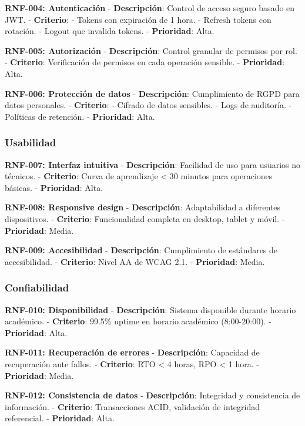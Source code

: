 \documentclass[12pt,a4paper,oneside]{report}
\begin{document}
\textbf{RNF-004: Autenticación} - \textbf{Descripción}: Control de
acceso seguro basado en JWT. - \textbf{Criterio}: - Tokens con
expiración de 1 hora. - Refresh tokens con rotación. - Logout que
invalida tokens. - \textbf{Prioridad}: Alta.

\textbf{RNF-005: Autorización} - \textbf{Descripción}: Control granular
de permisos por rol. - \textbf{Criterio}: Verificación de permisos en
cada operación sensible. - \textbf{Prioridad}: Alta.

\textbf{RNF-006: Protección de datos} - \textbf{Descripción}:
Cumplimiento de RGPD para datos personales. - \textbf{Criterio}: -
Cifrado de datos sensibles. - Logs de auditoría. - Políticas de
retención. - \textbf{Prioridad}: Alta.

\subsubsection{Usabilidad}\label{usabilidad}

\textbf{RNF-007: Interfaz intuitiva} - \textbf{Descripción}: Facilidad
de uso para usuarios no técnicos. - \textbf{Criterio}: Curva de
aprendizaje \textless{} 30 minutos para operaciones básicas. -
\textbf{Prioridad}: Alta.

\textbf{RNF-008: Responsive design} - \textbf{Descripción}:
Adaptabilidad a diferentes dispositivos. - \textbf{Criterio}:
Funcionalidad completa en desktop, tablet y móvil. - \textbf{Prioridad}:
Media.

\textbf{RNF-009: Accesibilidad} - \textbf{Descripción}: Cumplimiento de
estándares de accesibilidad. - \textbf{Criterio}: Nivel AA de WCAG 2.1.
- \textbf{Prioridad}: Media.

\subsubsection{Confiabilidad}\label{confiabilidad}

\textbf{RNF-010: Disponibilidad} - \textbf{Descripción}: Sistema
disponible durante horario académico. - \textbf{Criterio}: 99.5\% uptime
en horario académico (8:00-20:00). - \textbf{Prioridad}: Alta.

\textbf{RNF-011: Recuperación de errores} - \textbf{Descripción}:
Capacidad de recuperación ante fallos. - \textbf{Criterio}: RTO
\textless{} 4 horas, RPO \textless{} 1 hora. - \textbf{Prioridad}:
Media.

\textbf{RNF-012: Consistencia de datos} - \textbf{Descripción}:
Integridad y consistencia de información. - \textbf{Criterio}:
Transacciones ACID, validación de integridad referencial. -
\textbf{Prioridad}: Alta.
\end{document}
